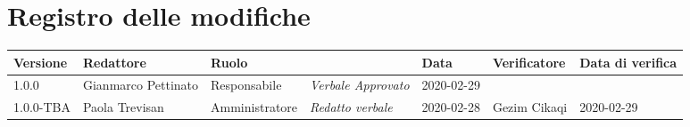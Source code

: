 \section*{Registro delle modifiche}
\renewcommand{\arraystretch}{1.8}

  \setlength\LTleft{-1.7cm}
  \begin{longtable}{|p{1.5cm}|p{1.7cm}|p{2cm}|p{2cm}|p{1.7cm}|p{2cm}|p{1.7cm}|}
    \hline

    \rowcolor{header}
    \textbf{Versione} & \textbf{Redattore} & \textbf{Ruolo} & \centering{\textbf{Descrizione}} & \textbf{Data} & \textbf{Verificatore} & \textbf{Data di verifica}\\

    \hline
    1.0.0 & Gianmarco Pettinato & Responsabile & \small{\textit{Verbale Approvato}} & 2020-02-29 & &\\
	  1.0.0-TBA & Paola Trevisan & Amministratore & \small{\textit{Redatto verbale}} & 2020-02-28 & Gezim Cikaqi & 2020-02-29 \\
    \hline
  \end{longtable}
  \setlength\LTleft{0cm}
